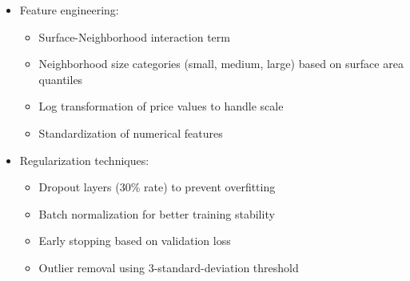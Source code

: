 \documentclass[twocolumn]{article}
\begin{document}
\begin{itemize}
    \item Feature engineering:
    \begin{itemize}
        \item Surface-Neighborhood interaction term
        \item Neighborhood size categories (small, medium, large) based on surface area quantiles
        \item Log transformation of price values to handle scale
        \item Standardization of numerical features
    \end{itemize}
    \item Regularization techniques:
    \begin{itemize}
        \item Dropout layers (30\% rate) to prevent overfitting
        \item Batch normalization for better training stability
        \item Early stopping based on validation loss
        \item Outlier removal using 3-standard-deviation threshold
    \end{itemize}
\end{itemize}
\end{document}
